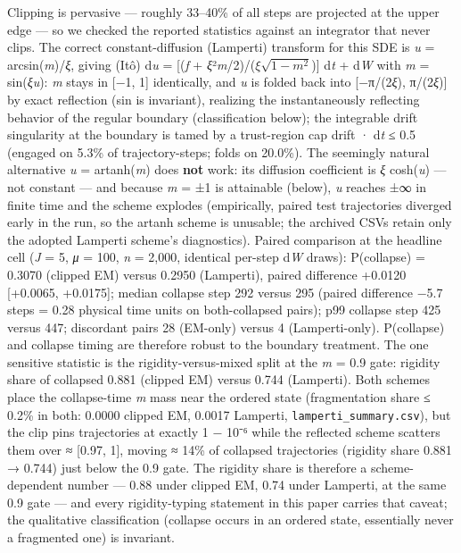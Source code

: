 \documentclass[11pt,letterpaper]{article}
\begin{document}
Clipping is pervasive --- roughly 33--40\% of all steps are projected at the upper edge --- so we checked the reported statistics against an integrator that never clips. The correct constant-diffusion (Lamperti) transform for this SDE is \emph{u} = arcsin(\emph{m})/\emph{ξ}, giving (Itô) d\emph{u} = {[}(\emph{f} + \emph{ξ}²\emph{m}/2)/(\(\xi \sqrt{1-m^2}\)){]} d\emph{t} + d\emph{W} with \emph{m} = sin(\emph{ξu}): \emph{m} stays in {[}−1, 1{]} identically, and \emph{u} is folded back into {[}−π/(2\emph{ξ}), π/(2\emph{ξ}){]} by exact reflection (sin is invariant), realizing the instantaneously reflecting behavior of the regular boundary (classification below); the integrable drift singularity at the boundary is tamed by a trust-region cap \textbar drift · d\emph{t}\textbar{} ≤ 0.5 (engaged on 5.3\% of trajectory-steps; folds on 20.0\%). The seemingly natural alternative \emph{u} = artanh(\emph{m}) does \textbf{not} work: its diffusion coefficient is \emph{ξ} cosh(\emph{u}) --- not constant --- and because \emph{m} = ±1 is attainable (below), \emph{u} reaches ±∞ in finite time and the scheme explodes (empirically, paired test trajectories diverged early in the run, so the artanh scheme is unusable; the archived CSVs retain only the adopted Lamperti scheme's diagnostics). Paired comparison at the headline cell (\emph{J} = 5, \emph{μ} = 100, \emph{n} = 2,000, identical per-step d\emph{W} draws): P(collapse) = 0.3070 (clipped EM) versus 0.2950 (Lamperti), paired difference +0.0120 {[}+0.0065, +0.0175{]}; median collapse step 292 versus 295 (paired difference −5.7 steps = 0.28 physical time units on both-collapsed pairs); p99 collapse step 425 versus 447; discordant pairs 28 (EM-only) versus 4 (Lamperti-only). P(collapse) and collapse timing are therefore robust to the boundary treatment. The one sensitive statistic is the rigidity-versus-mixed split at the \textbar{}\emph{m}\textbar{} = 0.9 gate: rigidity share of collapsed 0.881 (clipped EM) versus 0.744 (Lamperti). Both schemes place the collapse-time \textbar{}\emph{m}\textbar{} mass near the ordered state (fragmentation share ≤ 0.2\% in both: 0.0000 clipped EM, 0.0017 Lamperti, \texttt{lamperti\_summary.csv}), but the clip pins trajectories at exactly 1 − 10⁻⁶ while the reflected scheme scatters them over ≈ {[}0.97, 1{]}, moving ≈ 14\% of collapsed trajectories (rigidity share 0.881 → 0.744) just below the 0.9 gate. The rigidity share is therefore a scheme-dependent number --- 0.88 under clipped EM, 0.74 under Lamperti, at the same 0.9 gate --- and every rigidity-typing statement in this paper carries that caveat; the qualitative classification (collapse occurs in an ordered state, essentially never a fragmented one) is invariant.
\end{document}
